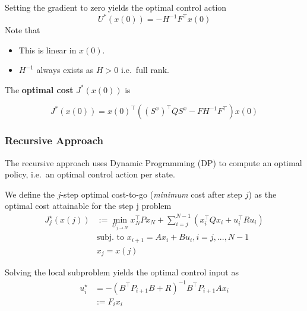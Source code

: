 \newpar{}

Setting the gradient to zero yields the optimal control action
\noindent\begin{equation*}
    U^*(x(0)) = -H^{-1}F^\top x(0)
\end{equation*}
Note that
\begin{itemize}
    \item This is linear in $x(0)$.
    \item $H^{-1}$ always exists as $H>0$ i.e.\ full rank.
\end{itemize}

\newpar{}
The \textbf{optimal cost} $J^*(x(0))$ is

\noindent\begin{equation*}
    J^*(x(0)) = {x(0)}^{\top}\left({(S^{x})}^{\top}\overline{Q}S^{x}- F H^{-1} F^\top\right)x(0)
\end{equation*}

\subsubsection{Recursive Approach}
The recursive approach uses Dynamic Programming (DP) to compute an optimal policy, i.e.\ an optimal control action per state.

\newpar{}

We define the $j$-step optimal cost-to-go (\textit{minimum} cost after step $j$) as the optimal cost attainable for the step j problem
\noindent\begin{align*}
    J_j^\star(x(j)) & :=\min_{U_{j\to N}}x_N^\top Px_N+\sum_{i=j}^{N-1}(x_i^\top Qx_i+u_i^\top Ru_i) \\
                    & \text{subj.\ to }x_{i+1}=Ax_i+Bu_i,i=j,...,N-1                                 \\
                    & x_j=x(j)
\end{align*}

\newpar{}

Solving the local subproblem yields the optimal control input as
\noindent\begin{equation*}
    \begin{aligned}
        u_{i}^{\star} & =-{(B^\top P_{i+1} B+R)}^{-1}B^\top P_{i+1} Ax_{i} \\
                        & :=F_{i}x_{i}
    \end{aligned}
\end{equation*}

